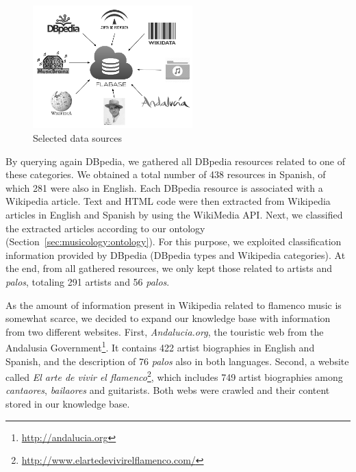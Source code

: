 \begin{figure}
	\centering
	\includegraphics[width=0.55\textwidth]{ch05_musicology_pics/datasources_bn.png}
	\caption{Selected data sources \label{fig:musicology:datasources}}
\end{figure}

By querying again DBpedia, we gathered all DBpedia resources related to one of these categories. We obtained a total number of 438 resources in Spanish, of which 281 were also in English. Each DBpedia resource is associated with a Wikipedia article. Text and HTML code were then extracted from Wikipedia articles in English and Spanish by using the WikiMedia API. 
Next, we classified the extracted articles according to our ontology (Section~\ref{sec:musicology:ontology}). For this purpose, we exploited classification information provided by DBpedia (DBpedia types and Wikipedia categories). At the end, from all gathered resources, we only kept those related to artists and \textit{palos}, totaling  291 artists and 56 \textit{palos}.

As the amount of information present in Wikipedia related to flamenco music is somewhat scarce, we decided to expand our knowledge base with information from two different websites. First, \textit{Andalucia.org}, the touristic web from the Andalusia Government\footnote{\url{http://andalucia.org}}. It contains 422 artist biographies in English and Spanish, and the description of 76 \textit{palos} also in both languages. Second, a website called \textit{El arte de vivir el flamenco}\footnote{\url{http://www.elartedevivirelflamenco.com/}}, which includes 749 artist biographies among \textit{cantaores}, \textit{bailaores} and guitarists. Both webs were crawled and their content stored in our knowledge base. %

